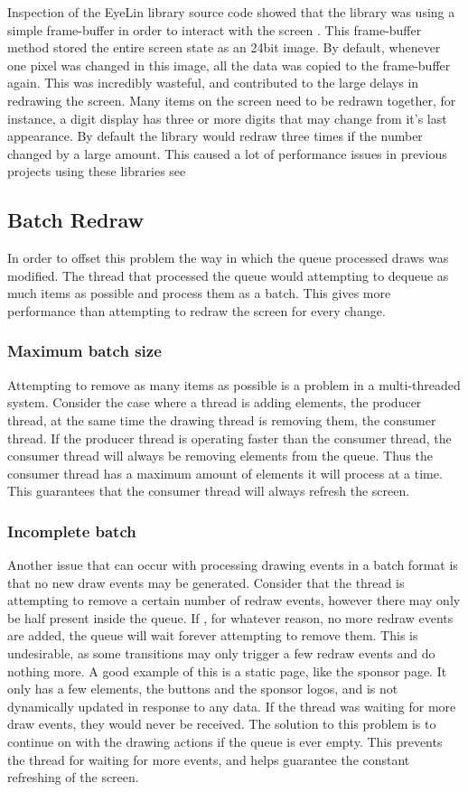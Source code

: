Inspection of the EyeLin library source code showed that the library was using a simple frame-buffer in order to interact with the screen . This frame-buffer method stored the entire screen state as an 24bit image. By default, whenever one pixel was changed in this image, all the data was copied to the frame-buffer again. This was incredibly wasteful, and contributed to the large delays in redrawing the screen. Many items on the screen need to be redrawn together, for instance, a digit display has three or more digits that may change from it's last appearance. By default the library would redraw three times if the number changed by a large amount. This caused a lot of performance issues in previous projects using these libraries see 

\subsection{Batch Redraw}

In order to offset this problem the way in which the queue processed draws was modified. The thread that processed the queue would attempting to dequeue as much items as possible and process them as a batch. This gives more performance than attempting to redraw the screen for every change.

\subsubsection{Maximum batch size}

Attempting to remove as many items as possible is a problem in a multi-threaded system. Consider the case where a thread is adding elements, the producer thread, at the same time the drawing thread is removing them, the consumer thread. If the producer thread is operating faster than the consumer thread, the consumer thread will always be removing elements from the queue. Thus the consumer thread has a maximum amount of elements it will process at a time. This guarantees that the consumer thread will always refresh the screen. 

\subsubsection{Incomplete batch}

Another issue that can occur with processing drawing events in a batch format is that no new draw events may be generated. Consider that the thread is attempting to remove a certain number of redraw events, however there may only be half present inside the queue. If , for whatever reason, no more redraw events are added, the queue will wait forever attempting to remove them. This is undesirable, as some transitions may only trigger a few redraw events and do nothing more. A good example of this is a static page, like the sponsor page. It only has a few elements, the buttons and the sponsor logos, and is not dynamically updated in response to any data. If the thread was waiting for more draw events, they would never be received. The solution to this problem is to continue on with the drawing actions if the queue is ever empty. This prevents the thread for waiting for more events, and helps guarantee the constant refreshing of the screen.



